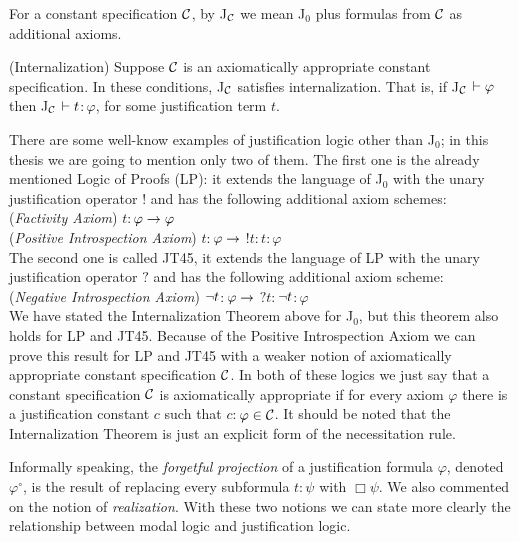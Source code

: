 \qquad For a constant specification $\mathcal{C}$, by J$_{\mathcal{C}}$ we mean J$_{0}$ plus formulas from $\mathcal{C}$ as additional axioms.

\begin{teor}
(Internalization) Suppose $\mathcal{C}$ is an axiomatically appropriate constant specification. In these conditions, J$_{\mathcal{C}}$ satisfies internalization. That is, if J$_{\mathcal{C}}$ $\vdash \varphi$ then J$_{\mathcal{C}}$ $\vdash  t$$:$$\varphi$, for some justification term $t$.
\end{teor}

\qquad There are some well-know examples of justification logic other than J$_{0}$; in this thesis we are going to mention only two of them. The first one is the already mentioned Logic of Proofs (LP): it extends the language of J$_{0}$ with the unary justification operator $!$ and has the following additional axiom schemes:\\

(\textit{Factivity Axiom}) $t$$:$$\varphi \rightarrow \varphi$\\

(\textit{Positive Introspection Axiom}) $t$$:$$\varphi \rightarrow$ $!t$$:$$t$$:$$\varphi$\\

\qquad The second one is called JT45, it extends the language of LP with the unary justification operator $?$ and has the following additional axiom scheme:\\

(\textit{Negative Introspection Axiom}) $\neg t$$:$$\varphi \rightarrow$ $?t$$:$$\neg t$$:$$\varphi$\\

\qquad We have stated the Internalization Theorem above for J$_{0}$, but this theorem also holds for LP and JT45. Because of the Positive Introspection Axiom we can prove this result for LP and JT45 with a weaker notion of axiomatically appropriate constant specification $\mathcal{C}$. In both of these logics we just say that a constant specification $\mathcal{C}$ is axiomatically appropriate if for every axiom $\varphi$ there is a justification constant $c$ such that $c$$:$$\varphi\in \mathcal{C}$. It should be noted that the Internalization Theorem is just an explicit form of the necessitation rule.

\qquad Informally speaking, the \textit{forgetful projection} of a justification formula $\varphi$, denoted $\varphi^{\circ}$, is the result of replacing every subformula $t$$:$$\psi$ with $\Box\psi$. We also commented on the notion of \textit{realization}. With these two notions we can state more clearly the relationship between modal logic and justification logic.




